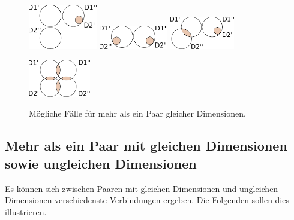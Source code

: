 \documentclass[11pt]{article}
\begin{document}
\begin{figure}[!htb]
%
    \centering
  \includegraphics[width=3cm]{CaseDifferentiation/CaseDifferentiation_2SameDim_TwoDimSeperate_OneDiffInAnother.pdf}
  \label{}
\endminipage
{}
    \centering
    \includegraphics[width=3cm]{CaseDifferentiation/CaseDifferentiation_2SameDim_TwoDimSeperate_OneDiffInAnother_2Times.pdf}
  \label{}
\endminipage\hfill
{}%
    \centering
  \includegraphics[width=2.8cm]{CaseDifferentiation/CaseDifferentiation_2SameDim_TwoDimSeperate_OneDiffInAnother_TwoDiffShareSomeDE.pdf}
  \label{}
\endminipage
\end{figure}

\begin{figure}[!htb]
%
    \centering
  \includegraphics[width=2.7cm]{CaseDifferentiation/CaseDifferentiation_2SameDim_Cross_1DimAllDePairPartnered_Cross_1DimAllDePairPartnered_BothDSDimShareSameDe.pdf}
  \label{}
\endminipage\hfill
    \caption{Mögliche Fälle für mehr als ein Paar gleicher Dimensionen.}
\end{figure}


%
%
\clearpage
\subsection{Mehr als ein Paar mit gleichen Dimensionen sowie ungleichen Dimensionen}

Es können sich zwischen Paaren mit gleichen Dimensionen und ungleichen Dimensionen verschiedenste Verbindungen ergeben. Die Folgenden sollen dies illustrieren. \\
\end{document}
